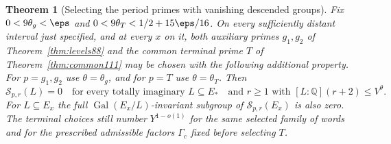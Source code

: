 \documentclass[a4paper,11pt]{article}
\newtheorem{theorem}[proposition]{Theorem}
\theoremstyle{definition}
\theoremstyle{remark}
\numberwithin{equation}{section}
\newcommand{\Sel}{\mathcal S}
\begin{document}
\begin{theorem}[Selecting the period primes with vanishing descended groups]\label{thm:markedstrict337}
Fix \(0<9\theta_g<\eps\) and
\(0<9\theta_T<1/2+15\eps/16\). On every sufficiently distant
interval just specified, and at every \(x\) on it, both auxiliary
primes \(g_1,g_2\) of Theorem~\ref{thm:levels88} and the common
terminal prime \(T\) of Theorem~\ref{thm:common111} may be chosen
with the following additional property. For \(p=g_1,g_2\) use
\(\theta=\theta_g\), and for \(p=T\) use \(\theta=\theta_T\). Then
\[
 \Sel_{p,r}(L)=0
 \quad\text{for every totally imaginary } L\subseteq E_*
 \quad\text{and }r\ge1\text{ with }[L:\mathbb Q](r+2)\le V^\theta .
\]
For \(L\subseteq E_x\) the full \(\operatorname{Gal}(E_x/L)\)-invariant
subgroup of \(\Sel_{p,r}(E_x)\) is also zero. The terminal choices
still number \(Y^{1-o(1)}\) for the same selected family of words
and for the prescribed admissible factors \(\Gamma_c\) fixed before
selecting \(T\).
\end{theorem}
\end{document}
